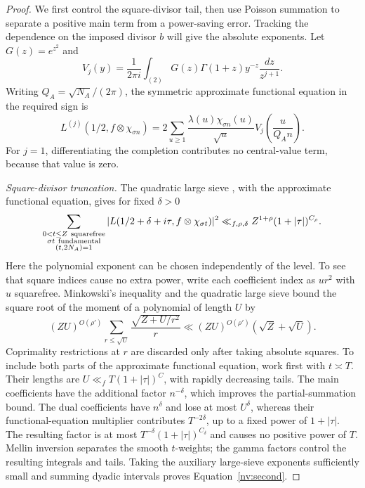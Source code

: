 \begin{proof}
We first control the square-divisor tail, then use Poisson summation to
separate a positive main term from a power-saving error. Tracking the
dependence on the imposed divisor $b$ will give the absolute exponents.
Let $G(z)=e^{z^2}$ and
\[
 V_j(y)=\frac1{2\pi i}\int_{(2)}
       G(z)\Gamma(1+z)y^{-z}\frac{dz}{z^{j+1}}.
\]
Writing $Q_A=\sqrt{N_A}/(2\pi)$, the symmetric approximate functional
equation in the required sign is
\begin{equation}\label{nv:afe}
L^{(j)}(1/2,f\otimes\chi_{\sigma n})
=2\sum_{u\ge1}\frac{\lambda(u)\chi_{\sigma n}(u)}{\sqrt u}
 V_j\!\left(\frac{u}{Q_A n}\right).
\end{equation}
For $j=1$, differentiating the completion contributes no central-value
term, because that value is zero.

\par\smallskip\noindent\emph{Square-divisor truncation.}
The quadratic large sieve
\cite[Theorem~1 and Corollary~1]{HeathBrown1995}, with the approximate functional equation,
gives for fixed $\delta>0$
\begin{equation}\label{nv:second}
 \sum_{\substack{0<t\le Z\ {\rm squarefree}\\
                 \sigma t\ {\rm fundamental}\\(t,2N_A)=1}}
 |L(1/2+\delta+i\tau,f\otimes\chi_{\sigma t})|^2
 \ll_{f,\rho,\delta} Z^{1+\rho}(1+|\tau|)^{C_\rho}.
\end{equation}
Here the polynomial exponent can be chosen independently of the level.
To see that square indices cause no extra power, write each coefficient
index as $ur^2$ with $u$ squarefree. Minkowski's inequality and the
quadratic large sieve bound the square root of the moment of a polynomial
of length $U$ by
\[
 (ZU)^{O(\rho')}
 \sum_{r\le\sqrt U}\frac{\sqrt{Z+U/r^2}}r
 \ll (ZU)^{O(\rho')}(\sqrt Z+\sqrt U).
\]
Coprimality restrictions at $r$ are discarded only after taking absolute
squares. To include both parts of the approximate functional equation,
work first with $t\asymp T$. Their lengths are
$U\ll_f T(1+|\tau|)^C$, with rapidly decreasing tails.
The main coefficients have the additional factor $n^{-\delta}$,
which improves the partial-summation bound. The dual coefficients
have $n^{\delta}$ and lose at most $U^{\delta}$, whereas their
functional-equation multiplier contributes $T^{-2\delta}$, up to
a fixed power of $1+|\tau|$. The resulting factor is at most
$T^{-\delta}(1+|\tau|)^{C_\delta}$ and causes no positive power
of $T$. Mellin inversion separates the smooth $t$-weights; the
gamma factors control the resulting integrals and tails.
Taking the auxiliary large-sieve exponents sufficiently small and
summing dyadic intervals proves Equation~\eqref{nv:second}.


\end{proof}
